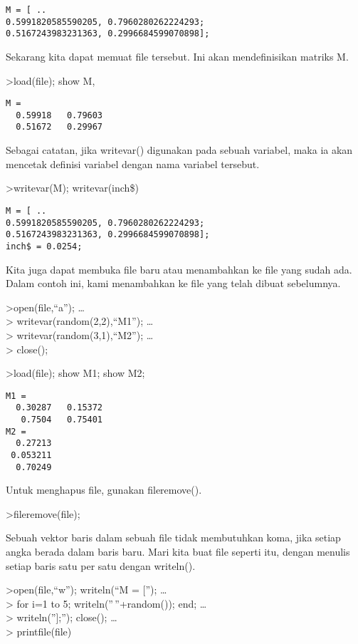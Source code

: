 \documentclass[
]{book}
\begin{document}
\begin{verbatim}
M = [ ..
0.5991820585590205, 0.7960280262224293;
0.5167243983231363, 0.2996684599070898];
\end{verbatim}

Sekarang kita dapat memuat file tersebut. Ini akan mendefinisikan matriks M.

\textgreater load(file); show M,

\begin{verbatim}
M = 
  0.59918   0.79603 
  0.51672   0.29967 
\end{verbatim}

Sebagai catatan, jika writevar() digunakan pada sebuah variabel, maka ia akan mencetak definisi variabel dengan nama variabel tersebut.

\textgreater writevar(M); writevar(inch\$)

\begin{verbatim}
M = [ ..
0.5991820585590205, 0.7960280262224293;
0.5167243983231363, 0.2996684599070898];
inch$ = 0.0254;
\end{verbatim}

Kita juga dapat membuka file baru atau menambahkan ke file yang sudah ada. Dalam contoh ini, kami menambahkan ke file yang telah dibuat sebelumnya.

\textgreater open(file,``a''); \ldots{}\\
\textgreater{} writevar(random(2,2),``M1''); \ldots{}\\
\textgreater{} writevar(random(3,1),``M2''); \ldots{}\\
\textgreater{} close();

\textgreater load(file); show M1; show M2;

\begin{verbatim}
M1 = 
  0.30287   0.15372 
   0.7504   0.75401 
M2 = 
  0.27213 
 0.053211 
  0.70249 
\end{verbatim}

Untuk menghapus file, gunakan fileremove().

\textgreater fileremove(file);

Sebuah vektor baris dalam sebuah file tidak membutuhkan koma, jika setiap angka berada dalam baris baru. Mari kita buat file seperti itu, dengan menulis setiap baris satu per satu dengan writeln().

\textgreater open(file,``w''); writeln(``M = {[}''); \ldots{}\\
\textgreater{} for i=1 to 5; writeln(''\,''+random()); end; \ldots{}\\
\textgreater{} writeln(''{]};''); close(); \ldots{}\\
\textgreater{} printfile(file)
\end{document}
